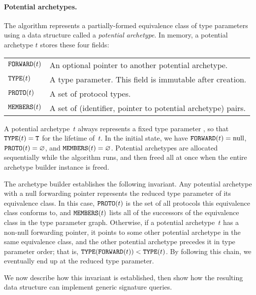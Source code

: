 \documentclass[../generics]{subfiles}
\begin{document}
\paragraph{Potential archetypes.}
The algorithm represents a partially-formed equivalence class of type parameters using a data structure called a \emph{potential archetype}. In memory, a potential archetype $t$ stores these four fields:
\begin{center}
\begin{tabular}{ll}
\toprule
$\texttt{FORWARD}(t)$& An optional pointer to another potential archetype.\\
$\texttt{TYPE}(t)$& A type parameter. This field is immutable after creation.\\
$\texttt{PROTO}(t)$& A set of protocol types.\\
$\texttt{MEMBERS}(t)$& A set of (identifier, pointer to potential archetype) pairs.\\
\bottomrule
\end{tabular}
\end{center}
A potential archetype~$t$ always represents a fixed type parameter \tT, so that $\texttt{TYPE}(t)=\texttt{T}$ for the lifetime of~$t$. In the initial state, we have $\texttt{FORWARD}(t)=\text{null}$, $\texttt{PROTO}(t)=\varnothing$, and $\texttt{MEMBERS}(t)=\varnothing$. Potential archetypes are allocated sequentially while the algorithm runs, and then freed all at once when the entire archetype builder instance is freed.

The archetype builder establishes the following invariant. Any potential archetype with a null forwarding pointer represents the reduced type parameter of its equivalence class. In this case, $\texttt{PROTO}(t)$ is the set of all protocols this equivalence class conforms to, and $\texttt{MEMBERS}(t)$ lists all of the successors of the equivalence class in the type parameter graph. Otherwise, if a potential archetype~$t$ has a non-null forwarding pointer, it points to some other potential archetype in the same equivalence class, and the other potential archetype precedes it in type parameter order; that is, $\texttt{TYPE}(\texttt{FORWARD}(t))<\texttt{TYPE}(t)$. By following this chain, we eventually end up at the reduced type parameter.

We now describe how this invariant is established, then show how the resulting data structure can implement generic signature queries.
\end{document}
